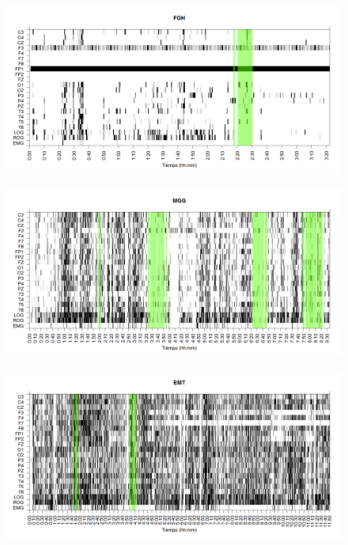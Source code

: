 \documentclass[12pt,a4paper]{mitthesis}
\begin{document}

\begin{figure}
\centering
\includegraphics[width=0.9\linewidth]
{./g170413/FGHSUE_est.png} 
\label{grf_FGH}
\end{figure}

\begin{figure}
\centering
\includegraphics[width=0.9\linewidth]
{./g170413/MGNA5SUE_est.png} 
\label{grf_MGG}
\end{figure}

\begin{figure}
\centering
\includegraphics[width=0.9\linewidth]
{./g170413/EMNNS_est.png} 
\label{grf_EMT}
\end{figure}
\end{document}
